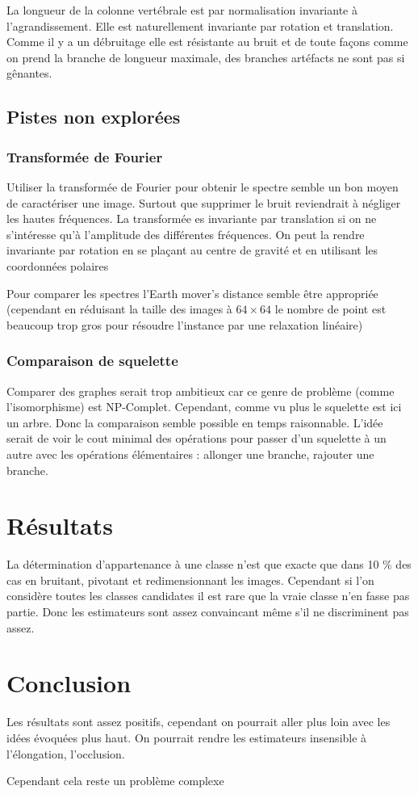\documentclass{article}
\theoremstyle{definition}
\begin{document}
      La longueur de la colonne vertébrale est par normalisation invariante à l'agrandissement. Elle est naturellement invariante par rotation et translation. Comme il y a un débruitage elle est résistante au bruit et de toute façons comme on prend la branche de longueur maximale, des branches artéfacts ne sont pas si gênantes.
    
    \subsection{Pistes non explorées}
        \subsubsection{Transformée de Fourier} 
        
        Utiliser la transformée de Fourier pour obtenir le spectre semble un bon moyen de caractériser une image. Surtout que supprimer le bruit reviendrait à négliger les hautes fréquences. La transformée es invariante par translation si on ne s'intéresse qu'à l'amplitude des différentes fréquences. On peut la rendre invariante par rotation en se plaçant au centre de gravité et en utilisant les coordonnées polaires
        
        Pour comparer les spectres l'Earth mover's distance semble être appropriée (cependant en réduisant la taille des images à $64 \times 64$ le nombre de point est beaucoup trop gros pour résoudre l'instance par une relaxation linéaire)
        
        \subsubsection{Comparaison de squelette} 
        
        Comparer des graphes serait trop ambitieux car ce genre de problème (comme l'isomorphisme) est NP-Complet. Cependant, comme vu plus le squelette est ici un arbre. Donc la comparaison semble possible en temps raisonnable. L'idée serait de voir le cout minimal des opérations pour passer d'un squelette à un autre avec les opérations élémentaires : allonger une branche, rajouter une branche.
  
  \section{Résultats} 

    La détermination d'appartenance à une classe n'est que exacte que dans 10 \% des cas en bruitant, pivotant et redimensionnant les images. Cependant si l'on considère toutes les classes candidates il est rare que la vraie classe n'en fasse pas partie. Donc les estimateurs sont assez convaincant même s'il ne discriminent pas assez.
  
  \section{Conclusion}
  
  Les résultats sont assez positifs, cependant on pourrait aller plus loin avec les idées évoquées plus haut. On pourrait rendre les estimateurs insensible à l'élongation, l'occlusion.
  
	Cependant cela reste un problème complexe
\end{document}
